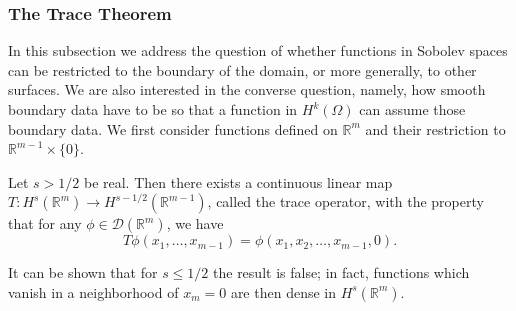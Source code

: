 \subsubsection{The Trace Theorem}\label{subsec:sobolev-trace-theorem}

In this subsection we address the question of whether functions in Sobolev spaces can be restricted to the boundary of the domain, or more generally, to other surfaces. We are also interested in the converse question, namely, how smooth boundary data have to be so that a function in $H^k(\Omega)$ can assume those boundary data. We first consider functions defined on $\mathbb{R}^m$ and their restriction to $\mathbb{R}^{m-1}\times\{0\}$.

\begin{Theorem}
\label{thm:hyperplane-sobolev-trace}
Let $s>1/2$ be real. Then there exists a continuous linear map $T:H^s(\mathbb{R}^m)\to H^{s-1/2}(\mathbb{R}^{m-1})$, called the trace operator, with the property that for any $\phi\in\mathcal{D}(\mathbb{R}^m)$, we have
\begin{equation}\label{eq:hyperplane-trace-test-function-restriction}
T\phi(x_1,\ldots,x_{m-1})=\phi(x_1,x_2,\ldots,x_{m-1},0).
\end{equation}

\end{Theorem}

It can be shown that for $s\leq1/2$ the result is false; in fact, functions which vanish in a neighborhood of $x_m=0$ are then dense in $H^s(\mathbb{R}^m)$.

